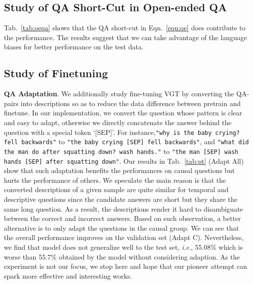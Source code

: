 \documentclass[10pt,journal,compsoc]{IEEEtran}
\newcommand{\ie}{\textit{i}.\textit{e}.}
\begin{document}
\subsection{Study of QA Short-Cut in Open-ended QA}
\label{app:shortcut}
Tab.~\ref{tab:oeqa} shows that the QA short-cut in Eqn.~\eqref{equ:oe} does contribute to the performance. The results suggest that we can take advantage of the language biases for better performance on the test data. 
\setlength{\tabcolsep}{3pt}
\begin{table}[t!]
    \small
    \centering
    \caption{Study of the QA short-cut prediction.}
    \label{tab:oeqa}
    \vspace{-0.5em}
\end{table}

\subsection{Study of Finetuning}
\label{app:adapt}
\textbf{QA Adaptation}. We additionally study fine-tuning VGT by converting the QA-pairs into descriptions so as to reduce the data difference between pretrain and finetune. In our implementation, we convert the question whose pattern is clear and easy to adapt, otherwise we directly concatenate the answer behind the question with a special token `[SEP]'. For instance,\texttt{"why is the baby crying? fell backwards"} to \texttt{"the baby crying [SEP] fell backwards"}, and \texttt{"what did the man do after squatting down? wash hands."} to \texttt{"the man [SEP] wash hands [SEP] after squatting down"}. Our results in Tab.~\ref{tab:pt} (Adapt All) show that such adaptation benefits the performances on causal questions but hurts the performance of others. We speculate the main reason is that the converted descriptions of a given sample are quite similar for temporal and descriptive questions since the candidate answers are short but they share the same long question. As a result, the descriptions render it hard to disambiguate between the correct and incorrect answers. Based on such observation, a better alternative is to only adapt the questions in the causal group. We can see that the overall performance improves on the validation set (Adapt C). Nevertheless, we find that model does not generalize well to the test set, \ie, 55.08\% which is worse than 55.7\% obtained by the model without considering adaption. As the experiment is not our focus, we stop here and hope that our pioneer attempt can spark more effective and interesting works.
\end{document}
